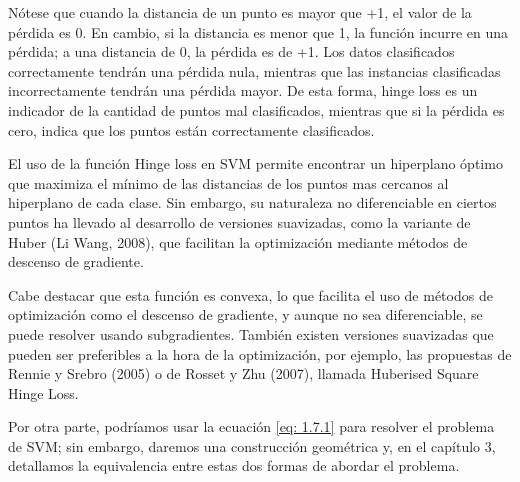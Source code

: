 \documentclass[letterpaper,12pt,oneside]{book}
\begin{document}
{{    Nótese que cuando la distancia de un punto es mayor que +1, el valor de la pérdida es 0. En cambio, si la distancia es menor que 1, la función incurre en una pérdida; a una distancia de 0, la pérdida es de +1. Los datos clasificados correctamente tendrán una pérdida nula, mientras que las instancias clasificadas incorrectamente tendrán una pérdida mayor. De esta forma, hinge loss es un indicador de la cantidad de puntos mal clasificados, mientras que si la pérdida es cero, indica que los puntos están correctamente clasificados.  
    
    El uso de la función Hinge loss en SVM permite encontrar un hiperplano óptimo que maximiza el mínimo de las distancias de los puntos mas cercanos al hiperplano de cada clase. Sin embargo, su naturaleza no diferenciable en ciertos puntos ha llevado al desarrollo de versiones suavizadas, como la variante de Huber (Li Wang, 2008), que facilitan la optimización mediante métodos de descenso de gradiente.
    
    Cabe destacar que esta función es convexa, lo que facilita el uso de métodos de optimización como el descenso de gradiente, y aunque no sea diferenciable, se puede resolver usando subgradientes. También existen versiones suavizadas que pueden ser preferibles a la hora de la optimización, por ejemplo, las propuestas de Rennie y Srebro (2005) o de Rosset y Zhu (2007), llamada Huberised Square Hinge Loss.
    
    Por otra parte, podríamos usar la ecuación \eqref{eq: 1.7.1} para resolver el problema de SVM; sin embargo, daremos una construcción geométrica y, en el capítulo 3, detallamos la equivalencia entre estas dos formas de abordar el problema.





















}}
\end{document}
